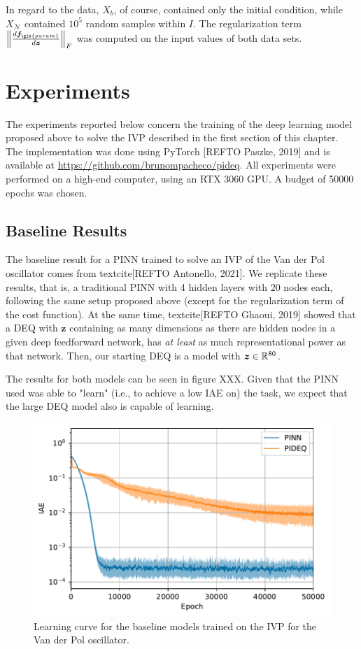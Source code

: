 In regard to the data, $X_b$, of course, contained only the initial condition, while $X_{\mathcal{N}}$ contained $10^5$ random samples within $I$.
The regularization term $\left\lVert \frac{d \bm{f}_{\gls{param}}}{d \bm{z}}\right\rVert_F$ was computed on the input values of both data sets.

\section{Experiments}

The experiments reported below concern the training of the deep learning model proposed above to solve the \gls{IVP} described in the first section of this chapter.
The implementation was done using PyTorch [REFTO Paszke, 2019] and is available at \url{https://github.com/brunompacheco/pideq}.
All experiments were performed on a high-end computer, using an RTX 3060 GPU.
A budget of 50000 epochs was chosen.

\subsection{Baseline Results}

The baseline result for a \gls{PINN} trained to solve an \gls{IVP} of the Van der Pol oscillator comes from textcite[REFTO Antonello, 2021].
We replicate these results, that is, a traditional \gls{PINN} with 4 hidden layers with 20 nodes each, following the same setup proposed above (except for the regularization term of the cost function).
At the same time, textcite[REFTO Ghaoui, 2019] showed that a \gls{DEQ} with $\bm{z}$ containing as many dimensions as there are hidden nodes in a given deep feedforward network, has \emph{at least} as much representational power as that network.
Then, our starting \gls{DEQ} is a model with  $\bm{z}\in \mathbb{R}^{80}$.

The results for both models can be seen in figure XXX.
Given that the \gls{PINN} used was able to "learn" (i.e., to achieve a low IAE on) the task, we expect that the large \gls{DEQ} model also is capable of learning.

\begin{figure}[h]
    \centering
	\includegraphics{images/exp_1_iae.pdf}
    \caption{Learning curve for the baseline models trained on the \gls{IVP} for the Van der Pol oscillator.}
    \label{fig:images-exp_1_iae-pdf}
\end{figure}

